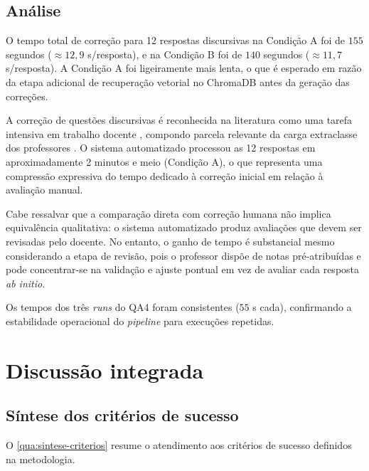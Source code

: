 \subsection{Análise}

O tempo total de correção para 12 respostas discursivas na Condição A foi de $155$ segundos ($\approx 12{,}9$ s/resposta), e na Condição B foi de $140$ segundos ($\approx 11{,}7$ s/resposta). A Condição A foi ligeiramente mais lenta, o que é esperado em razão da etapa adicional de recuperação vetorial no ChromaDB antes da geração das correções.

A correção de questões discursivas é reconhecida na literatura como uma tarefa intensiva em trabalho docente \cite{schneider_towards_2024}, compondo parcela relevante da carga extraclasse dos professores \cite{barbosa_tempo_2021}. O sistema automatizado processou as 12 respostas em aproximadamente 2 minutos e meio (Condição A), o que representa uma compressão expressiva do tempo dedicado à correção inicial em relação à avaliação manual.

Cabe ressalvar que a comparação direta com correção humana não implica equivalência qualitativa: o sistema automatizado produz avaliações que devem ser revisadas pelo docente. No entanto, o ganho de tempo é substancial mesmo considerando a etapa de revisão, pois o professor dispõe de notas pré-atribuídas e pode concentrar-se na validação e ajuste pontual em vez de avaliar cada resposta \textit{ab initio}.

Os tempos dos três \textit{runs} do QA4 foram consistentes ($55$ s cada), confirmando a estabilidade operacional do \textit{pipeline} para execuções repetidas.


\section{Discussão integrada}
\label{sec:discussao}

\subsection{Síntese dos critérios de sucesso}

O \autoref{qua:sintese-criterios} resume o atendimento aos critérios de sucesso definidos na metodologia.

